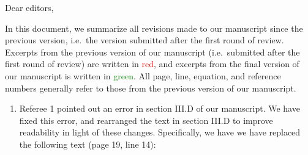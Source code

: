 \documentclass[preprint,showkeys,nofootinbib]{revtex4-1}
\newcommand{\1}{\mathds{1}}
\newcommand{\red}[1]{\textcolor{red}{#1}}
\newcommand{\green}[1]{\textcolor{green}{#1}}
\newcounter{point}
\begin{document}
Dear editors,

In this document, we summarize all revisions made to our manuscript
since the previous version, i.e.~the version submitted after the first
round of review.  Excerpts from the previous version of our manuscript
(i.e.~submitted after the first round of review) are written in
\red{red}, and excerpts from the final version of our manuscript is
written in \green{green}.  All page, line, equation, and reference
numbers generally refer to those from the previous version of our
manuscript.

\begin{enumerate}
\item Referee 1 pointed out an error in section III.D of our
  manuscript.  We have fixed this error, and rearranged the text in
  section III.D to improve readability in light of these changes.
  Specifically, we have we have replaced the following text (page 19,
  line 14):


\end{enumerate}
\end{document}
